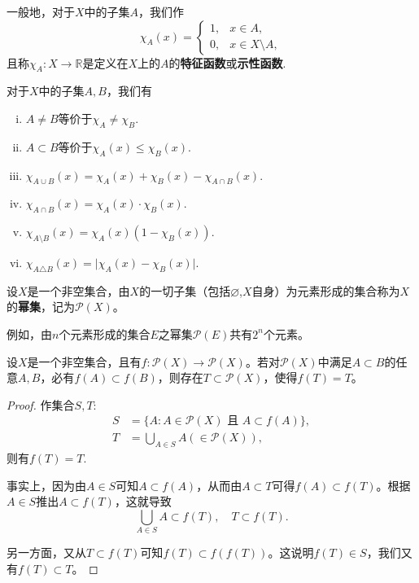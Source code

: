 \documentclass[lang=cn,newtx,10pt,scheme=chinese]{../Template/elegantbook}
\begin{document}
\begin{definition}[示性函数]\label{definition:示性函数}
  一般地，对于\(X\)中的子集\(A\)，我们作
\[
\chi_A(x)=
\begin{cases}
1, & x\in A, \\
0, & x\in X\setminus A,
\end{cases}
\]
且称\(\chi_A:X\rightarrow\mathbb{R}\)是定义在\(X\)上的\(A\)的\textbf{特征函数}或\textbf{示性函数}.
\end{definition}

\begin{proposition}[示性函数的基本性质]\label{proposition:示性函数的基本性质}
  对于\(X\)中的子集\(A,B\)，我们有
\begin{enumerate}[(i)]
  \item \(A\neq B\)等价于\(\chi_A\neq\chi_B\).

  \item \(A\subset B\)等价于\(\chi_A(x)\leqslant\chi_B(x)\).

  \item \(\chi_{A\cup B}(x)=\chi_A(x)+\chi_B(x)-\chi_{A\cap B}(x)\).

  \item \(\chi_{A\cap B}(x)=\chi_A(x)\cdot\chi_B(x)\).

  \item \(\chi_{A\setminus B}(x)=\chi_A(x)(1 - \chi_B(x))\).
  
  \item \(\chi_{A\triangle B}(x)=\vert\chi_A(x)-\chi_B(x)\vert\).
\end{enumerate}
\end{proposition}

\begin{definition}[幂集]\label{definition:幂集}
  设\(X\)是一个非空集合，由\(X\)的一切子集（包括\(\varnothing\),\(X\)自身）为元素形成的集合称为\(X\)的\textbf{幂集}，记为\(\mathcal{P}(X)\)。
\end{definition}
\begin{note}
  例如，由\(n\)个元素形成的集合\(E\)之幂集\(\mathcal{P}(E)\)共有\(2^n\)个元素。
\end{note}

\begin{example}[单调映射的不动点]\label{example:单调映射的不动点}
设\(X\)是一个非空集合，且有\(f:\mathcal{P}(X)\to\mathcal{P}(X)\)。若对\(\mathcal{P}(X)\)中满足\(A\subset B\)的任意\(A,B\)，必有\(f(A)\subset f(B)\)，则存在\(T\subset\mathcal{P}(X)\)，使得\(f(T)=T\)。
\end{example}
\begin{proof}
作集合\(S,T\):
\begin{align*}
S&=\{A:A\in\mathcal{P}(X)\text{ 且 }A\subset f(A)\},\\
T&=\bigcup_{A\in S}A(\in\mathcal{P}(X)),
\end{align*}
则有\(f(T)=T\).

事实上，因为由\(A\in S\)可知\(A\subset f(A)\)，从而由\(A\subset T\)可得\(f(A)\subset f(T)\)。根据\(A\in S\)推出\(A\subset f(T)\)，这就导致
\[
\bigcup_{A\in S}A\subset f(T),\quad T\subset f(T).
\]

另一方面，又从\(T\subset f(T)\)可知\(f(T)\subset f(f(T))\)。这说明\(f(T)\in S\)，我们又有\(f(T)\subset T\)。
\end{proof}
\end{document}
